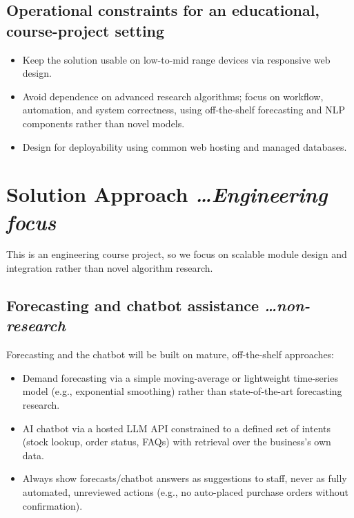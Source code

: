 \documentclass[11pt,a4paper]{article}
\newcommand{\BvrHint}[1]{%
  {\normalfont\normalsize\itshape\hfill #1}}
\begin{document}
\subsection{Operational constraints for an educational, course-project setting}
\begin{itemize}[leftmargin=0.7cm]
    \item Keep the solution usable on low-to-mid range devices via responsive web design.
    \item Avoid dependence on advanced research algorithms; focus on workflow, automation, and system correctness, using off-the-shelf forecasting and NLP components rather than novel models.
    \item Design for deployability using common web hosting and managed databases.
\end{itemize}

\section{Solution Approach %
\BvrHint{\ldots Engineering focus}}
This is an engineering course project, so we focus on scalable module design and integration rather than novel algorithm research.

\subsection{Forecasting and chatbot assistance %
\BvrHint{\ldots non-research}}
Forecasting and the chatbot will be built on mature, off-the-shelf approaches:
\begin{itemize}[leftmargin=0.7cm]
    \item Demand forecasting via a simple moving-average or lightweight time-series model (e.g., exponential smoothing) rather than state-of-the-art forecasting research.
    \item AI chatbot via a hosted LLM API constrained to a defined set of intents (stock lookup, order status, FAQs) with retrieval over the business's own data.
    \item Always show forecasts/chatbot answers as suggestions to staff, never as fully automated, unreviewed actions (e.g., no auto-placed purchase orders without confirmation).
\end{itemize}
\end{document}

